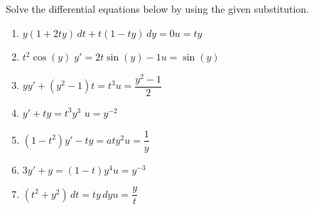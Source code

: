 \iffalse
\item Solve the differential equations below by using the given substitution.
\begin{enumerate}
\item $y \left( 1 + 2 t y \right)\, d t + t \left( 1 - ty \right) \, d y = 0$\hfill $u = ty$
\item $t^2 \cos  (y)\; y' = 2 t \sin  (y) - 1$\hfill $u=\sin (y)$
\item $y y' + \left( y^2 - 1 \right) t = t^3$\hfill $u=\dfrac{y^2-1}{2}$

\item $y' + t y = t^3 y^3$ \hfill $u=y^{-2}$
\item $\left( 1 - t^2 \right) y' - t y = a t y^2$\hfill $u=\dfrac{1}{y}$
\item $3 y' + y = \left( 1 - t \right) y^4$\hfill $u=y^{-3}$
\item $\left( t^2 + y^2 \right) \, d t = t y\, d y $\hfill $u=\dfrac{y}{t}$


\end{enumerate}
